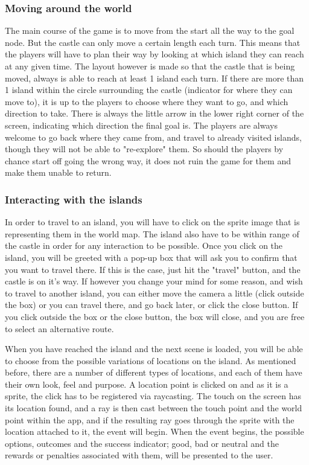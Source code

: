 \subsubsection{Moving around the world}
The main course of the game is to move from the start all the way to the goal node. But the castle can only move a certain length each turn. This means that the players will have to plan their way by looking at which island they can reach at any given time. The layout however is made so that the castle that is being moved, always is able to reach at least 1 island each turn. If there are more than 1 island within the circle surrounding the castle (indicator for where they can move to), it is up to the players to choose where they want to go, and which direction to take. There is always the little arrow in the lower right corner of the screen, indicating which direction the final goal is. The players are always welcome to go back where they came from, and travel to already visited islands, though they will not be able to "re-explore" them. So should the players by chance start off going the wrong way, it does not ruin the game for them and make them unable to return.

\subsubsection{Interacting with the islands}
In order to travel to an island, you will have to click on the sprite image that is representing them in the world map. The island also have to be within range of the castle in order for any interaction to be possible. 
Once you click on the island, you will be greeted with a pop-up box that will ask you to confirm that you want to travel there. If this is the case, just hit the "travel" button, and the castle is on it's way. If however you change your mind for some reason, and wish to travel to another island, you can either move the camera a little (click outside the box) or you can travel there, and go back later, or click the close button. If you click outside the box or the close button, the box will close, and you are free to select an alternative route.

When you have reached the island and the next scene is loaded, you will be able to choose from the possible variations of locations on the island. As mentioned before, there are a number of different types of locations, and each of them have their own look, feel and purpose.
A location point is clicked on and as it is a sprite, the click has to be registered via raycasting. The touch on the screen has its location found, and a ray is then cast between the touch point and the world point within the app, and if the resulting ray goes through the sprite with the location attached to it, the event will begin. When the event begins, the possible options, outcomes and the success indicator; good, bad or neutral and the rewards or penalties associated with them, will be presented to the user.

